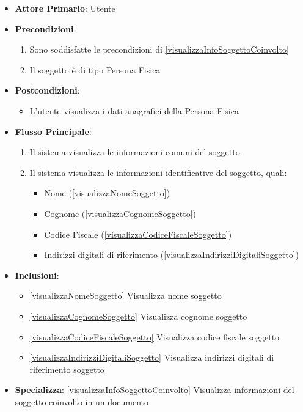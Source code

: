 \begin{itemize}
    \item \textbf{Attore Primario}: Utente

    \item \textbf{Precondizioni}:
    \begin{enumerate}
        \item Sono soddisfatte le precondizioni di \ref{visualizzaInfoSoggettoCoinvolto}
        \item Il soggetto è di tipo Persona Fisica
    \end{enumerate}

    \item \textbf{Postcondizioni}:
    \begin{itemize}
        \item L'utente visualizza i dati anagrafici della Persona Fisica
    \end{itemize}

    \item \textbf{Flusso Principale}:
    \begin{enumerate}
        \item Il sistema visualizza le informazioni comuni del soggetto
        \item Il sistema visualizza le informazioni identificative del soggetto, quali:
        \begin{itemize}
            \item Nome (\ref{visualizzaNomeSoggetto})
            \item Cognome (\ref{visualizzaCognomeSoggetto})
            \item Codice Fiscale (\ref{visualizzaCodiceFiscaleSoggetto})
            \item Indirizzi digitali di riferimento (\ref{visualizzaIndirizziDigitaliSoggetto})
        \end{itemize}
    \end{enumerate}
    \item \textbf{Inclusioni}:
    \begin{itemize}
        \item \ref{visualizzaNomeSoggetto} Visualizza nome soggetto
        \item \ref{visualizzaCognomeSoggetto} Visualizza cognome soggetto
        \item \ref{visualizzaCodiceFiscaleSoggetto} Visualizza codice fiscale soggetto
        \item \ref{visualizzaIndirizziDigitaliSoggetto} Visualizza indirizzi digitali di riferimento soggetto
    \end{itemize}
    \item \textbf{Specializza}: \ref{visualizzaInfoSoggettoCoinvolto} Visualizza informazioni del soggetto coinvolto in un documento
\end{itemize}
